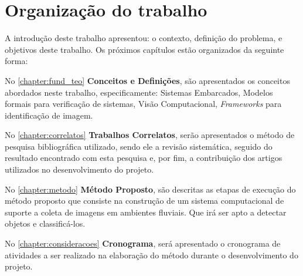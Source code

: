 \section{Organização do trabalho}
A introdução deste trabalho apresentou: o contexto, definição do problema, e objetivos deste trabalho. Os próximos capítulos estão organizados da seguinte forma:

\par
No \autoref{chapter:fund_teo} \textbf{Conceitos e Definições}, são apresentados os conceitos abordados neste trabalho, especificamente: Sistemas Embarcados, Modelos formais para verificação de sistemas, Visão Computacional, \textit{Frameworks} para identificação de imagem.

\par
No \autoref{chapter:correlatos} \textbf{Trabalhos Correlatos}, serão apresentados o método de pesquisa bibliográfica utilizado, sendo ele a revisão sistemática, seguido do resultado encontrado com esta pesquisa e, por fim, a contribuição dos artigos utilizados no desenvolvimento do projeto.
\par
No \autoref{chapter:metodo} \textbf{Método Proposto}, são descritas as etapas de execução do método proposto que consiste na construção de um sistema computacional de suporte a coleta de imagens em ambientes fluviais. Que irá ser apto a detectar objetos e classificá-los.

\par
No \autoref{chapter:consideracoes} \textbf{Cronograma}, será apresentado o cronograma de atividades a ser realizado na elaboração do método durante o desenvolvimento do projeto.

